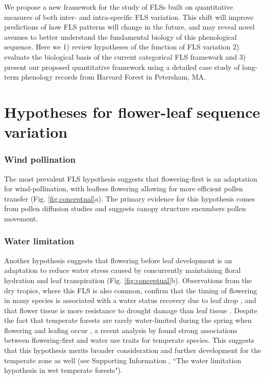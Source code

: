 \documentclass[11pt]{article}
\begin{document}
\noindent We propose a new framework for the study of FLSs built on quantitative measures of both inter- and intra-specific FLS variation. This shift will improve predictions of how FLS patterns will change in the future, and  may reveal novel avenues to better understand the fundamental biology of this phenological sequence. Here we 1) review hypotheses of the function of FLS variation 2) evaluate the biological basis of the current categorical FLS framework and 3) present our proposed quantitative framework using a detailed case study of long-term phenology records from Harvard Forest in Petersham, MA.

\section*{Hypotheses for flower-leaf sequence variation}
\subsubsection*{ Wind pollination}
\noindent The most prevalent FLS hypothesis suggests that flowering-first is an adaptation for wind-pollination, with leafless flowering allowing for more efficient pollen transfer \citep{Whitehead1969}(Fig. \ref{fig:conceptual}a). The primary evidence for this hypothesis comes from pollen diffusion studies \citep[e.g., particle movement through closed and open canopies,][]{Niklas1985, Milleron2012} and suggests canopy structure encumbers pollen movement. %
\subsubsection*{Water limitation}
\noindent Another hypothesis suggests that flowering before leaf development is an adaptation to reduce water stress caused by concurrently maintaining floral hydration and leaf transpiration \citep{Franklin2016} (Fig. \ref{fig:conceptual}b). Observations from the dry tropics, where this FLS is also common, confirm that the timing of flowering in many species is associated with a water status recovery due to leaf drop \citep{Borchert1983,Reich1984}, and that flower tissue is more resistance to drought damage than leaf tissue \citep{Zhang2017}. Despite the fact that temperate forests are rarely water-limited during the spring when flowering and leafing occur \citep{Polgar2011}, a recent analysis by \citet{Gougherty2018} found strong associations between flowering-first and water use traits for temperate species. This suggests that this hypothesis merits broader consideration and further development for the temperate zone as well (see Supporting Information , ``The water limitation hypothesis in wet temperate forests"). %
 
\end{document}
